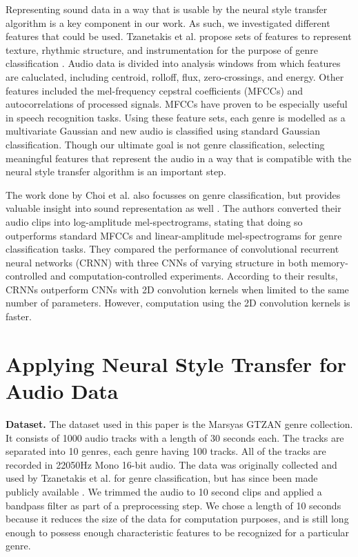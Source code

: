 \documentclass{article}
\begin{document}
Representing sound data in a way that is usable by the neural style transfer algorithm is a key component in our work. As such, we investigated different features that could be used. Tzanetakis et al. propose sets of features to represent texture, rhythmic structure, and instrumentation for the purpose of genre classification \citep{Tzanetakis2001}. Audio data is divided into analysis windows from which features are caluclated, including centroid, rolloff, flux, zero-crossings, and energy. Other features included the mel-frequency cepstral coefficients (MFCCs) and autocorrelations of processed signals. MFCCs have proven to be especially useful in speech recognition tasks. Using these feature sets, each genre is modelled as a multivariate Gaussian and new audio is classified using standard Gaussian classification. Though our ultimate goal is not genre classification, selecting meaningful features that represent the audio in a way that is compatible with the neural style transfer algorithm is an important step.

The work done by Choi et al. also focusses on genre classification, but provides valuable insight into sound representation as well \citep{Choi2016}. The authors converted their audio clips into log-amplitude mel-spectrograms, stating that doing so outperforms standard MFCCs and linear-amplitude mel-spectrograms for genre classification tasks. They compared the performance of convolutional recurrent neural networks (CRNN) with three CNNs of varying structure in both memory-controlled and computation-controlled experiments. According to their results, CRNNs outperform CNNs with 2D convolution kernels when limited to the same number of parameters. However, computation using the 2D convolution kernels is faster.

\section{Applying Neural Style Transfer for Audio Data}

\textbf{Dataset.} \hspace{0.25cm} The dataset used in this paper is the Marsyas GTZAN genre collection. It consists of 1000 audio tracks with a length of 30 seconds each. The tracks are separated into 10 genres, each genre having 100 tracks. All of the tracks are recorded in 22050Hz Mono 16-bit audio. The data was originally collected and used by Tzanetakis et al. for genre classification, but has since been made publicly available \citep{Tzanetakis2002}. We trimmed the audio to 10 second clips and applied a bandpass filter as part of a preprocessing step. We chose a length of 10 seconds because it reduces the size of the data for computation purposes, and is still long enough to possess enough characteristic features to be recognized for a particular genre.
\end{document}
